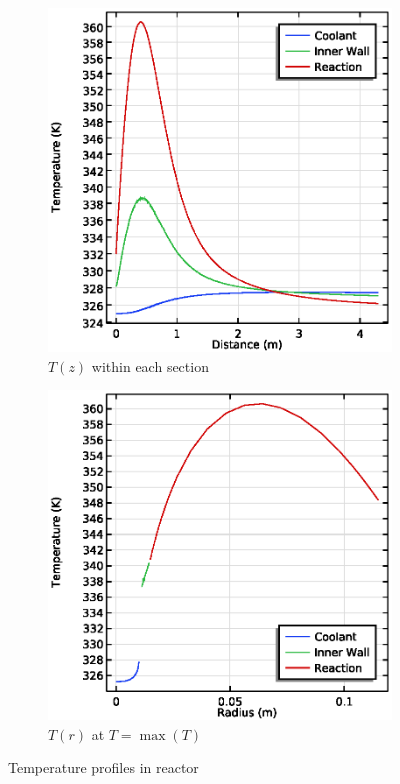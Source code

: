 \begin{figure}[p]
    \begin{minipage}{\linewidth}
        \centering
        \begin{subfigure}{0.42\linewidth}
            \includegraphics[width=\linewidth]{figures/temperature-lines.eps}
            \caption{$T(z)$ within each section}
            \label{fig:comsol-temperature:lines}
        \end{subfigure}\hspace{\floatsep}
        \begin{subfigure}{0.42\linewidth}
            \includegraphics[width=\linewidth]{figures/Tr-maxT.eps}
            \caption{$T(r)$ at $T = \max(T)$}
            \label{fig:comsol-temperature:radial}
        \end{subfigure}
        \caption{Temperature profiles in reactor}
        \label{fig:comsol-temperature}
    \end{minipage}
    
\end{figure}
